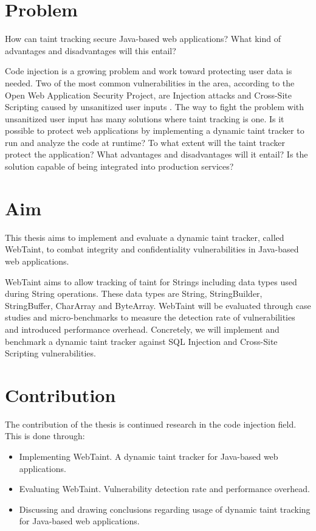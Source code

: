 \section{Problem}
\label{Problem}
\begin{chapquote}{}
    How can taint tracking secure Java-based web applications? What kind of advantages and disadvantages will this entail?
\end{chapquote}

\noindent
Code injection is a growing problem and work toward protecting user data is needed. Two of the most common vulnerabilities in the area, according to the Open Web Application Security Project, are Injection attacks and Cross-Site Scripting caused by unsanitized user inputs \parencite{OWASP2017}. The way to fight the problem with unsanitized user input has many solutions where taint tracking is one. Is it possible to protect web applications by implementing a dynamic taint tracker to run and analyze the code at runtime? To what extent will the taint tracker protect the application? What advantages and disadvantages will it entail? Is the solution capable of being integrated into production services?



\section{Aim}
\label{Aim}
This thesis aims to implement and evaluate a dynamic taint tracker, called WebTaint, to combat integrity and confidentiality vulnerabilities in Java-based web applications. 

WebTaint aims to allow tracking of taint for Strings including data types used during String operations. These data types are String, StringBuilder, StringBuffer, CharArray and ByteArray. WebTaint will be evaluated through case studies and micro-benchmarks to measure the detection rate of vulnerabilities and introduced performance overhead. Concretely, we will implement and benchmark a dynamic taint tracker against SQL Injection and Cross-Site Scripting vulnerabilities. 



\section{Contribution}
\label{Contribution}
The contribution of the thesis is continued research in the code injection field. This is done through:

\begin{itemize}  
    \item Implementing WebTaint. A dynamic taint tracker for Java-based web applications.
    \item Evaluating WebTaint. Vulnerability detection rate and performance overhead.
    \item Discussing and drawing conclusions regarding usage of dynamic taint tracking for Java-based web applications.
\end{itemize}



